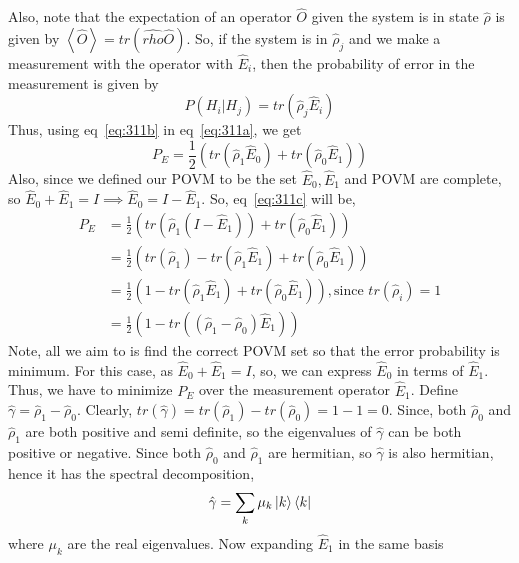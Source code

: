 Also, note that the expectation of an operator $\hat{O}$ given the system is in state $\hat{\rho}$ is given by $\left<\hat{O}\right> = tr(\hat{rho}\hat{O})$.
So, if the system is in $\hat{\rho}_j$ and we make a measurement with the operator with $\hat{E}_i$, then the probability of error in the measurement is given by
\begin{equation}
    P(H_i|H_j) = tr(\hat{\rho}_j \hat{E}_i)
    \label{eq:311b}
\end{equation}
Thus, using eq~\ref{eq:311b} in eq~\ref{eq:311a}, we get
\begin{equation}
    P_E = \frac{1}{2} (tr(\hat{\rho}_1 \hat{E}_0) + tr(\hat{\rho}_0 \hat{E}_1))
    \label{eq:311c}
\end{equation}
Also, since we defined our POVM to be the set {$\hat{E}_0, \hat{E}_1$} and POVM are complete, so $\hat{E}_0 + \hat{E}_1 = I \implies \hat{E}_0 = I - \hat{E}_1$.
So, eq~\ref{eq:311c} will be,
\begin{equation}
    \begin{split}
        P_E &= \frac{1}{2} (tr(\hat{\rho}_1 (I - \hat{E}_1)) + tr(\hat{\rho}_0 \hat{E}_1)) \\
            &= \frac{1}{2} (tr(\hat{\rho}_1) - tr(\hat{\rho}_1 \hat{E}_1) + tr(\hat{\rho}_0 \hat{E}_1))\\
            &= \frac{1}{2} (1 - tr(\hat{\rho}_1 \hat{E}_1) + tr(\hat{\rho}_0 \hat{E}_1)) , \text{since }tr(\hat{\rho}_i) = 1\\
            &= \frac{1}{2} (1 - tr((\hat{\rho}_1 - \hat{\rho}_0) \hat{E}_1))
    \end{split}
    \label{eq:311d}
\end{equation}
Note, all we aim to is find the correct POVM set so that the error probability is minimum. For this case, as $\hat{E}_0 + \hat{E}_1 = I$, so, we can express $\hat{E}_0$ in terms of $\hat{E}_1$. Thus, we have to minimize $P_E$ over the measurement operator $\hat{E}_1$.
Define $\hat{\gamma} = \hat{\rho} _ 1 - \hat{\rho}_0$. Clearly, $tr(\hat{\gamma}) = tr(\hat{\rho}_1) - tr(\hat{\rho}_0) = 1 - 1 = 0$. Since, both $\hat{\rho}_0$ and $\hat{\rho}_1$ are both positive and semi definite, so the eigenvalues of $\hat{\gamma}$ can be both positive or negative.
Since both $\hat{\rho}_0$ and $\hat{\rho}_1$ are hermitian, so $\hat{\gamma}$ is also hermitian, hence it has the spectral decomposition,
\begin{equation}
    \hat{\gamma} = \sum_k \mu_k \ket{k}\bra{k}
\end{equation}
where $\mu_k$ are the real eigenvalues. Now expanding $\hat{E}_1$ in the same basis
